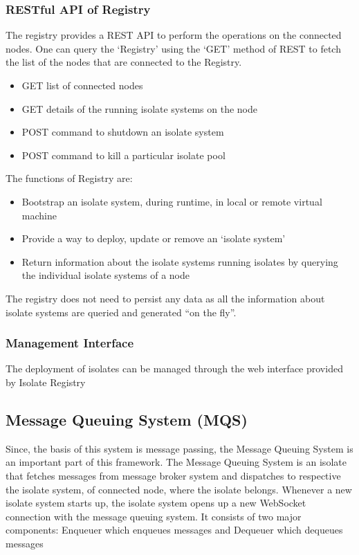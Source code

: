   \subsubsection{RESTful API of Registry}
  The registry provides a REST API to perform the operations on the connected nodes. One can query the ‘Registry’ using the ‘GET’ method of REST to fetch the list of the nodes that are connected to the Registry.
  \begin{itemize}
  \item GET list of connected nodes
  \item GET details of the running isolate systems on the node
  \item POST command to shutdown an isolate system
  \item POST command to kill a particular isolate pool
  \end{itemize}

The functions of Registry are:
\begin{itemize}
  \item Bootstrap an isolate system, during runtime, in local or remote virtual machine
  \item Provide a way to deploy, update or remove an ‘isolate system’
  \item Return information about the isolate systems running isolates by querying the individual isolate systems of a node
\end{itemize}
The registry does not need to persist any data as all the information about isolate systems are queried and generated “on the fly”.

  \subsubsection{Management Interface}
  The deployment of isolates can be managed through the web interface provided by Isolate Registry

\subsection{Message Queuing System (MQS)}
Since, the basis of this system is message passing, the Message Queuing System is an important part of this framework. The Message Queuing System is an isolate that fetches messages from message broker system and dispatches to respective the isolate system, of connected node, where the isolate belongs. Whenever a new isolate system starts up, the isolate system opens up a new WebSocket connection with the message queuing system.
It consists of two major components: Enqueuer \textendash{} which enqueues messages and Dequeuer \textendash{} which dequeues messages
